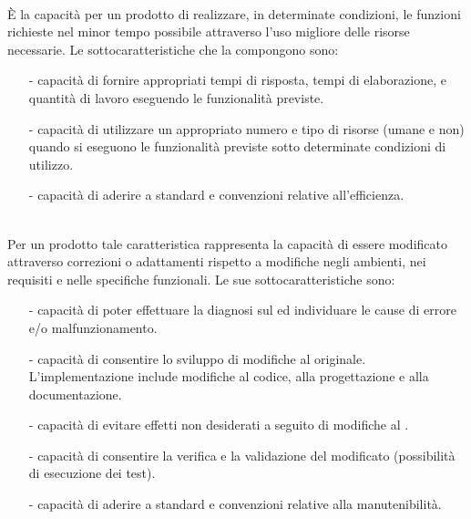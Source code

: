 \documentclass[a4paper, titlepage]{article}
\begin{document}
\begin{description}
\item {}
\\È la capacità per un prodotto  di realizzare, in determinate condizioni, le funzioni richieste nel minor tempo possibile attraverso l'uso migliore delle risorse necessarie.
\newline Le sottocaratteristiche che la compongono sono:
\begin{itemize}
\item[-] capacità di fornire appropriati tempi di risposta, tempi di elaborazione, e quantità di lavoro eseguendo le funzionalità previste.
\item[-] capacità di utilizzare un appropriato numero e tipo di risorse (umane e non) quando si eseguono le funzionalità previste sotto determinate condizioni di utilizzo.
\item[-] capacità di aderire a standard e convenzioni relative all'efficienza.
\\
\end{itemize}
\item {}
\\Per un prodotto  tale caratteristica rappresenta la capacità di essere modificato attraverso correzioni o adattamenti rispetto a modifiche negli ambienti, nei requisiti e nelle specifiche funzionali.
\newline Le sue sottocaratteristiche sono:
\begin{itemize}
\item[-] capacità di poter effettuare la diagnosi sul  ed individuare le cause di errore e/o malfunzionamento.
\item[-] capacità di consentire lo sviluppo di modifiche al  originale. L'implementazione include modifiche al codice, alla progettazione e alla documentazione.
\item[-] capacità di evitare effetti non desiderati a seguito di modifiche al .
\item[-] capacità di consentire la verifica e la validazione del  modificato (possibilità di esecuzione dei test).
\item[-] capacità di aderire a standard e convenzioni relative alla manutenibilità.
\\
\end{itemize}


\end{description}
\end{document}
